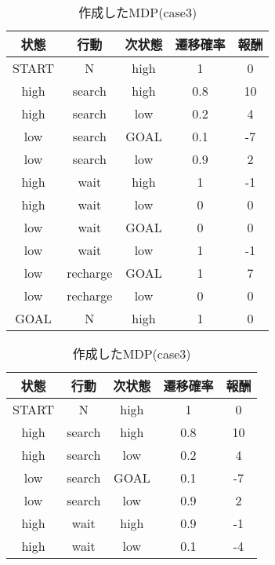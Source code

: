 \begin{enumerate}
  \begin{table}
    \begin{minipage}[t]{0.45\hsize}
      \centering
      \caption{作成したMDP(case2)}
      \label{table:2}
        \begin{tabular}{|c|c|c|c|c|}
          \hline
          状態 & 行動 & 次状態 & 遷移確率 & 報酬\\
          \hline
          \hline
          START & N & high & 1 & 0 \\
          \hline
          high & search & high & 0.8 & 10 \\
          high & search & low & 0.2 & 4 \\
          \hline
          low & search & GOAL & 0.1 & -7 \\
          low & search & low & 0.9 & 2 \\
          \hline
          high & wait & high & 1 & -1 \\
          high & wait & low & 0 & 0 \\
          \hline
          low & wait & GOAL & 0 & 0 \\
          low & wait & low & 1 & -1 \\
          \hline
          low & recharge & GOAL & 1 & 7 \\
          low & recharge & low & 0 & 0 \\
          \hline
          GOAL & N & high & 1 & 0 \\
          \hline
        \end{tabular}
      \end{minipage}
      \begin{minipage}[t]{0.45\hsize}
        \centering
        \caption{作成したMDP(case3)}
        \label{table:3}
          \begin{tabular}{|c|c|c|c|c|}
            \hline
            状態 & 行動 & 次状態 & 遷移確率 & 報酬\\
            \hline
            \hline
            START & N & high & 1 & 0 \\
            \hline
            high & search & high & 0.8 & 10 \\
            high & search & low & 0.2 & 4 \\
            \hline
            low & search & GOAL & 0.1 & -7 \\
            low & search & low & 0.9 & 2 \\
            \hline
            high & wait & high & 0.9 & -1 \\
            high & wait & low & 0.1 & -4 \\

\end{tabular}
\end{minipage}
\end{table}
\end{enumerate}
